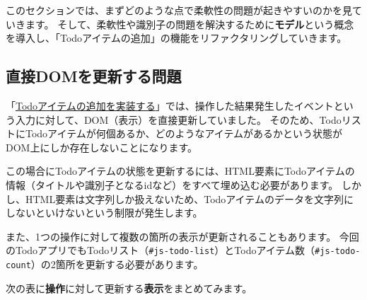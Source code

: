 このセクションでは、まずどのような点で柔軟性の問題が起きやすいのかを見ていきます。
そして、柔軟性や識別子の問題を解決するために\textbf{モデル}という概念を導入し、「Todoアイテムの追加」の機能をリファクタリングしていきます。

\hypertarget{direct-dom-modification-issue}{%
\subsection{直接DOMを更新する問題}\label{direct-dom-modification-issue}}

「\href{../form-event/README.md}{Todoアイテムの追加を実装する}」では、操作した結果発生したイベントという入力に対して、DOM（表示）を直接更新していました。
そのため、TodoリストにTodoアイテムが何個あるか、どのようなアイテムがあるかという状態がDOM上にしか存在しないことになります。

この場合にTodoアイテムの状態を更新するには、HTML要素にTodoアイテムの情報（タイトルや識別子となるidなど）をすべて埋め込む必要があります。
しかし、HTML要素は文字列しか扱えないため、Todoアイテムのデータを文字列にしないといけないという制限が発生します。

また、1つの操作に対して複数の箇所の表示が更新されることもあります。
今回のTodoアプリでもTodoリスト（\texttt{\#js-todo-list}）とTodoアイテム数（\texttt{\#js-todo-count}）の2箇所を更新する必要があります。

次の表に\textbf{操作}に対して更新する\textbf{表示}をまとめてみます。

